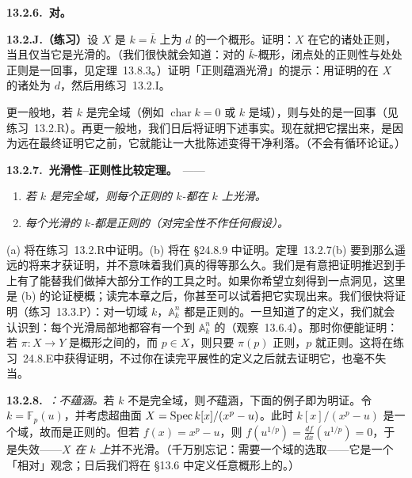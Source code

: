 \textbf{13.2.6.\ \trRegularity{}对\trSmoothness。}

\textbf{13.2.J.（练习）}\quad 设 $X$ 是\trAlgClosedField{} $k=\overline{k}$ 上\trPureDimension{}为 $d$ 的一个\trLocally\trFiniteType{}概形。证明：$X$ 在它的诸\trClosedPoint{}处正则，当且仅当它是光滑的。（我们很快就会知道：对\trLocally\trFiniteType{}的 $\overline{k}$-概形，闭点处的正则性与处处正则是一回事，见定理~13.8.3。）证明「正则蕴涵光滑」的提示：用\trJacobianCriterion{}证明\trJacobianMatrix{}的\trCorank{}在 $X$ 的诸\trClosedPoint{}处为 $d$，然后用\mbox{练习~13.2.I}。

更一般地，若 $k$ 是完全域（例如 $\operatorname{char}k=0$ 或 $k$ 是\trFinite{}域），则\trSmoothness{}与\trClosedPoint{}处的\trRegularity{}是一回事（见\mbox{练习~13.2.R}）。再更一般地，我们日后将证明下述事实。现在就把它摆出来，是因为远在最终证明它之前，它就能让一大批陈述变得干净利落。（不会有循环论证。）

\textbf{13.2.7.\ 光滑性--正则性比较定理。}\ ——
\begin{enumerate}[label=(\alph*)]
\item \emph{若 $k$ 是完全域，则每个正则的\trFiniteType{} $k$-\trScheme{}都在 $k$ 上光滑。}
\item \emph{每个光滑的 $k$-\trScheme{}都是正则的（对完全性不作任何假设）。}
\end{enumerate}

(a) 将在\mbox{练习~13.2.R}中证明。(b) 将在 \S24.8.9 中证明。定理~13.2.7(b) 要到那么遥远的将来才获证明，并不意味着我们真的得等那么久。我们是有意把证明推迟到手上有了能替我们做掉大部分工作的工具之时。如果你希望立刻得到一点洞见，这里是 (b) 的论证梗概；读完本章之后，你甚至可以试着把它实现出来。我们很快将证明（\mbox{练习~13.3.P}）：对一切域 $k$，$\mathbb{A}^n_k$ 都是正则的。一旦知道了\trEtale{}\trMorphism{}的定义，我们就会认识到：每个光滑\trVariety{}局部地都容有一个到 $\mathbb{A}^n_k$ 的\trEtale{}\trMorphism（观察~13.6.4）。那时你便能证明：若 $\pi\colon X\to Y$ 是\trLocally\trNoetherian{}概形之间的\trEtale{}\trMorphism，而 $p\in X$，则只要 $\pi(p)$ 正则，$p$ 就正则。这将在\mbox{练习~24.8.E}中获得证明，不过你在读完平展性的定义之后就去证明它，也毫不失当。

\textbf{13.2.8.}\ \emph{\trhCaveat{}：\trRegularity{}不蕴涵\trSmoothness。}\quad 若 $k$ 不是完全域，则\trRegularity{}\emph{不}蕴涵\trSmoothness，下面的例子即为明证。令 $k=\mathbb{F}_p(u)$，并考虑超曲面 $X=\operatorname{Spec} k[x]/(x^p-u)$。此时 $k[x]/(x^p-u)$ 是一个域，故而是正则的。但若 $f(x)=x^p-u$，则 $f(u^{1/p})=\frac{df}{dx}(u^{1/p})=0$，于是\trJacobianCriterion{}失效——$X$ \emph{在 $k$ 上}并不光滑。（千万别忘记：\trSmoothness{}需要一个域的选取——它是一个「相对」观念；日后我们将在 \S13.6 中定义任意概形上的\trSmoothness。）

